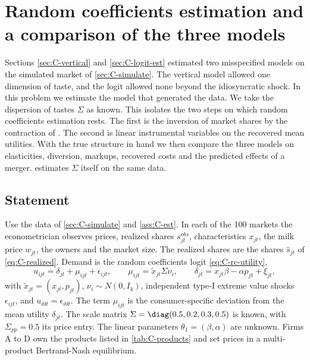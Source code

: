 \section{Random coefficients estimation and a comparison of the three models}\label{sec:C-rc-est}

Sections \ref{sec:C-vertical} and \ref{sec:C-logit-est} estimated two misspecified models on the simulated market of
\cref{sec:C-simulate}. The vertical model allowed one dimension of taste, and the logit allowed none beyond the
idiosyncratic shock. In this problem we estimate the model that generated the data. We take the dispersion of tastes
$\Sigma$ as known. This isolates the two steps on which random coefficients estimation rests. The first is the
inversion of market shares by the contraction of \citet{BerryLevinsohnPakes1995}. The second is linear instrumental
variables on the recovered mean utilities. With the true structure in hand we then compare the three models on elasticities, diversion, markups,
recovered costs and the predicted effects of a merger.  estimates $\Sigma$ itself on the same data.

\subsection{Statement}

Use the data of \cref{sec:C-simulate} and \cref{ass:C-est}. In each of the 100 markets the econometrician observes
prices, realized shares $s^{obs}_{jt}$, characteristics $x_{jt}$, the milk price $w_{jt}$, the owners and the market
size. The realized shares are the shares $\hat s_{jt}$ of \eqref{eq:C-realized}. Demand is the random coefficients logit
\eqref{eq:C-rc-utility},
\begin{equation}\label{eq:C-rc-model}
  u_{ijt} = \delta_{jt} + \mu_{ijt} + \epsilon_{ijt}, \qquad \mu_{ijt} = \tilde x_{jt}\Sigma\nu_i, \qquad
  \delta_{jt} = x_{jt}\beta - \alpha p_{jt} + \xi_{jt},
\end{equation}
with $\tilde x_{jt} = (x_{jt}, p_{jt})$, $\nu_i \sim N(0, I_4)$, independent type-I extreme value shocks
$\epsilon_{ijt}$, and $u_{i0t} = \epsilon_{i0t}$. The term $\mu_{ijt}$ is the consumer-specific deviation from the mean
utility $\delta_{jt}$. The scale matrix $\Sigma = \diag(0.5, 0.2, 0.3, 0.5)$ is known, with $\Sigma_{pp} = 0.5$ its
price entry. The linear parameters $\theta_1 = (\beta, \alpha)$ are unknown. Firms A to D own the products listed in
\cref{tab:C-products} and set prices in a multi-product Bertrand-Nash equilibrium.

